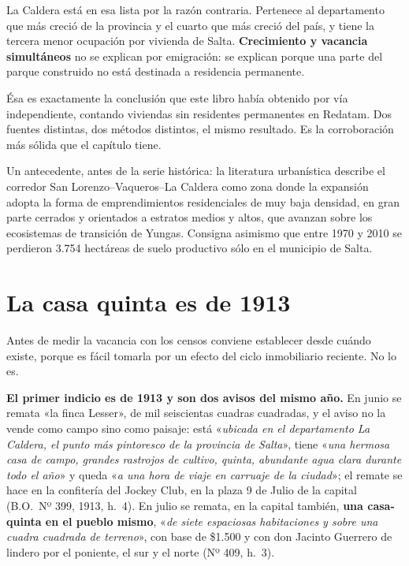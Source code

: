 La Caldera está en esa lista por la razón contraria. Pertenece al departamento que más creció de la provincia y el cuarto que más creció del país, y tiene la tercera menor ocupación por vivienda de Salta. \textbf{Crecimiento y vacancia simultáneos} no se explican por emigración: se explican porque una parte del parque construido no está destinada a residencia permanente.

Ésa es exactamente la conclusión que este libro había obtenido por vía independiente, contando viviendas sin residentes permanentes en Redatam. Dos fuentes distintas, dos métodos distintos, el mismo resultado. Es la corroboración más sólida que el capítulo tiene.


Un antecedente, antes de la serie histórica: la literatura urbanística describe el corredor San Lorenzo--Vaqueros--La Caldera como zona donde la expansión adopta la forma de emprendimientos residenciales de muy baja densidad, en gran parte cerrados y orientados a estratos medios y altos, que avanzan sobre los ecosistemas de transición de Yungas. Consigna asimismo que entre 1970 y 2010 se perdieron 3.754 hectáreas de suelo productivo sólo en el municipio de Salta.


\section{La casa quinta es de 1913}

Antes de medir la vacancia con los censos conviene establecer desde cuándo existe, porque
es fácil tomarla por un efecto del ciclo
inmobiliario reciente. No lo es.

\textbf{El primer indicio es de 1913 y son dos avisos del mismo año.} En junio se remata «la
finca Lesser», de mil seiscientas cuadras cuadradas, y el aviso no la vende como campo sino
como paisaje: está «\textit{ubicada en el departamento La Caldera, el punto más pintoresco de
la provincia de Salta}», tiene «\textit{una hermosa casa de campo, grandes rastrojos de
cultivo, quinta, abundante agua clara durante todo el año}» y queda «\textit{a una hora de
viaje en carruaje de la ciudad}»; el remate se hace en la confitería del Jockey Club, en la
plaza 9 de Julio de la capital (B.O.\ Nº 399, 1913, h.\ 4). En julio se remata, en la capital
también, \textbf{una casa-quinta en el pueblo mismo}, «\textit{de siete espaciosas habitaciones
y sobre una cuadra cuadrada de terreno}», con base de \$1.500 y con don Jacinto
Guerrero de lindero por el poniente, el sur y el norte (Nº 409, h.\ 3).

